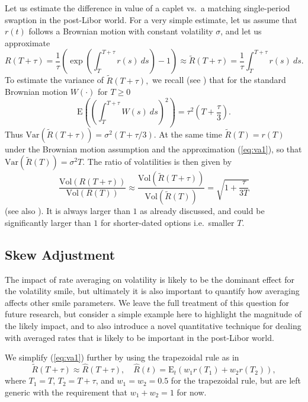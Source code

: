\documentclass{article}
\begin{document}
Let us estimate the difference in value of a caplet vs.~a matching
single-period swaption in the post-Libor world. For a very simple estimate,
let us assume that $r(t)$ follows a Brownian motion with constant volatility 
$\sigma $, and let us approximate%
\begin{equation}
R(T+\tau )=\frac{1}{\tau }\left( \exp \left( \int_{T}^{T+\tau
}r(s)~ds\right) -1\right) \approx \widetilde{R}(T+\tau )=\frac{1}{\tau }%
\int_{T}^{T+\tau }r(s)~ds.  \label{eq:va1}
\end{equation}%
To estimate the variance of $\widetilde{R}(T+\tau ),$ we recall (see \cite%
{vp-br}) that for the standard Brownian motion $W(\cdot )$ for $T\geq 0$%
\begin{equation*}
\mathrm{E}\left( \left( \int_{T}^{T+\tau }W(s)~ds\right) ^{2}\right) =\tau
^{2}\left( T+\frac{\tau }{3}\right) .
\end{equation*}%
Thus $\mathrm{Var}\left( \widetilde{R}(T+\tau )\right) =\sigma ^{2}(T+\tau
/3).$ At the same time $\widetilde{R}(T)=r(T)$ under the Brownian motion
assumption and the approximation (\ref{eq:va1}), so that $\mathrm{Var}\left( 
\widetilde{R}(T)\right) =\sigma ^{2}T.$ The ratio of volatilities is then
given by%
\begin{equation}
\frac{\mathrm{Vol}\left( R(T+\tau )\right) }{\mathrm{Vol}\left( R(T)\right) }%
\approx \frac{\mathrm{Vol}\left( \widetilde{R}(T+\tau )\right) }{\mathrm{Vol}%
\left( \widetilde{R}(T)\right) }=\sqrt{1+\frac{\tau }{3T}}  \label{eq:cpl9}
\end{equation}%
(see also \cite{lyas-merk-ssrn}). It is always larger than $1$ as already
discussed, and could be significantly larger than $1$ for shorter-dated
options i.e.~smaller $T.$

\subsection{Skew Adjustment\label{sec:asian_skew}}

The impact of rate averaging on volatility is likely to be the dominant
effect for the volatility smile, but ultimately it is also important to
quantify how averaging affects other smile parameters. We leave the full
treatment of this question for future research, but consider a simple
example here to highlight the magnitude of the likely impact, and to also
introduce a novel quantitative technique for dealing with averaged rates
that is likely to be important in the post-Libor world.

We simplify (\ref{eq:va1}) further by using the trapezoidal rule as in%
\begin{equation*}
\widetilde{R}(T+\tau )\approx \widehat{R}(T+\tau ),\quad \widehat{R}(t)=%
\mathrm{E}_{t}\left( w_{1}r(T_{1})+w_{2}r(T_{2})\right) ,
\end{equation*}%
where $T_{1}=T$, $T_{2}=T+\tau $, and $w_{1}=w_{2}=0.5$ for the trapezoidal
rule, but are left generic with the requirement that $w_{1}+w_{2}=1$ for now.
\end{document}
